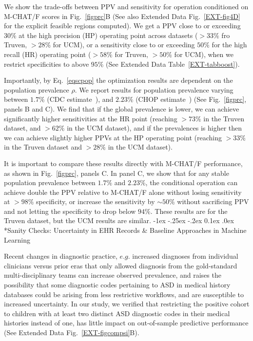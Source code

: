 \documentclass[onecolumn,,10pt]{IEEEtran}
\makeatletter
\renewcommand\subsection{\@startsection {section}{1}{\z@}%
  {-1ex \@plus -.25ex \@minus -.2ex}%
  {0.1ex \@plus.0ex}%
  {\fontsize{11}{12}\selectfont\bfseries\sffamily\color{DodgerBlue4}}}
\def\treatment{positive\xspace}
\makeatother
\begin{document}
We show the trade-offs between PPV and sensitivity for operation conditioned on M-CHAT/F scores in Fig.~\ref{figprc}B (See also Extended Data Fig.~\ref{EXT-fig4D} for the explicit feasible regions computed). 
We get a PPV close to or exceeding $30\%$ at the high precision (HP) operating point across datasets ($>33\%$ fro Truven, $>28\%$ for UCM), or a sensitivity close to or exceeding $50\%$ for the high recall (HR) operating point ($>58\%$ for  Truven, $>50\%$ for UCM), when we restrict specificities to above $95\%$ (See Extended Data Table~\ref{EXT-tabboost}). 
  
Importantly, by Eq.~\eqref{eqscpop}  the optimization results  are dependent on the population prevalence $\rho$. We report results  for population prevalence varying between $1.7\%$ (CDC estimate~\cite{hyman2020identification}), and $2.23\%$ (CHOP estimate~\cite{pmid31562252}) (See Fig.~\ref{figprc}, panels B and C). We find that if the global prevalence is lower, we can achieve significantly higher sensitivities at the HR point (reaching $>73\%$ in the Truven dataset, and $>62\%$ in the UCM dataset), and if the prevalences is higher then we can achieve slightly higher PPVs at the HP operating point (reaching $>33\%$ in the Truven dataset and $>28\%$ in the UCM dataset).

It is important to compare these results directly with M-CHAT/F performance, as shown in Fig.~\ref{figprc}, panels C. In panel C, we show that for any stable population prevalence between 
$1.7\%$ and $2.23\%$, the conditional operation can achieve  double the PPV relative to M-CHAT/F alone without losing sensitivity at $>98\%$ specificity, or increase the sensitivity by $\sim 50\%$ without sacrificing PPV and   not letting the  specificity to drop below $94\%$.
These results are for the Truven dataset, but the UCM results are similar.
%
\subsection*{Sanity Checks: Uncertainty in EHR Records \& Baseline Approaches in Machine Learning}

Recent changes in diagnostic practice, $e.g.$ increased diagnoses from individual clinicians versus prior eras that only allowed diagnosis from the gold-standard multi-disciplinary teams can  increase observed   prevalence, and  raises the possibility that  some diagnostic codes pertaining to ASD in medical history databases could be arising from less restrictive workflows, and  are susceptible to increased uncertainty.  In our study, we verified that restricting the \treatment cohort to children with at least two  distinct ASD diagnostic codes in their medical histories instead of one, has little impact on  out-of-sample predictive performance (See Extended Data Fig.~\ref{EXT-figcompsi}B).
 
\end{document}
